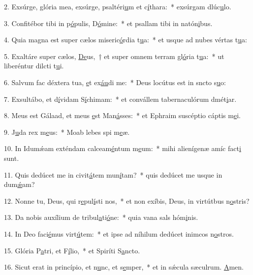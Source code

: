 2. Exsúrge, glória mea, exsúrge, psaltéri\uline{u}m et c\uline{í}thara:~* exsúrgam dlúc\uline{u}lo.\par 
3. Confitébor tibi in p\uline{ó}pulis, D\uline{ó}mine:~* et psallam tibi in natón\uline{i}bus.\par 
4. Quia magna est super cælos miseric\uline{ó}rdia t\uline{u}a:~* et usque ad nubes vértas t\uline{u}a:\par 
5. Exaltáre super cælos, \uline{De}us,~† et super omnem terram gl\uline{ó}ria t\uline{u}a:~* ut liberéntur dilcti t\uline{u}i.\par 
6. Salvum fac déxtera tua, \uline{e}t ex\uline{áu}di me:~* Deus locútus est in sncto s\uline{u}o:\par 
7. Exsultábo, et d\uline{í}vidam S\uline{í}chimam:~* et convállem tabernaculórum dmét\uline{i}ar.\par 
8. Meus est Gálaad, et meus \uline{e}st Man\uline{á}sses:~* et Ephraim suscéptio cáptis m\uline{e}i.\par 
9. J\uline{u}da rex m\uline{e}us:~* Moab lebes spi m\uline{e}æ.\par 
10. In Idumǽam exténdam calceam\uline{é}ntum m\uline{e}um:~* mihi alienígenæ amíc fact\uline{i} sunt.\par 
11. Quis dedúcet me in civit\uline{á}tem mun\uline{í}tam?~* quis dedúcet me usque in dum\uline{ǽ}am?\par 
12. Nonne tu, Deus, qui r\uline{e}pul\uline{í}sti nos,~* et non exíbis, Deus, in virtútbus n\uline{o}stris?\par 
13. Da nobis auxílium de tribul\uline{a}ti\uline{ó}ne:~* quia vana sals hóm\uline{i}nis.\par 
14. In Deo faci\uline{é}mus virt\uline{ú}tem:~* et ipse ad níhilum dedúcet inimcos n\uline{o}stros.\par 
15. Glória P\uline{a}tri, et F\uline{í}lio,~* et Spiríti S\uline{a}ncto.\par 
16. Sicut erat in princípio, et n\uline{u}nc, et s\uline{e}mper,~* et in sǽcula sæculrum. \uline{A}men.\par 
